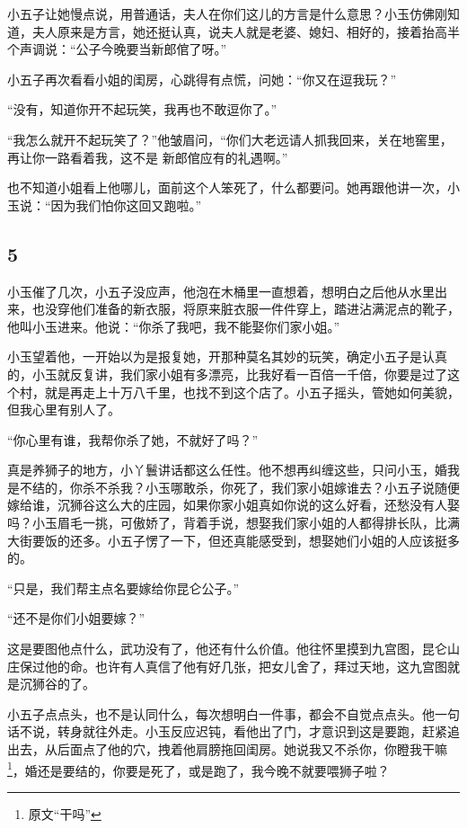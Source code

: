小五子让她慢点说，用普通话，夫人在你们这儿的方言是什么意思？小玉仿佛刚知道，夫人原来是方言，她还挺认真，说夫人就是老婆、媳妇、相好的，接着抬高半个声调说：“公子今晚要当新郎倌了呀。”

小五子再次看看小姐的闺房，心跳得有点慌，问她：“你又在逗我玩？”

“没有，知道你开不起玩笑，我再也不敢逗你了。”

“我怎么就开不起玩笑了？”他皱眉问，“你们大老远请人抓我回来，关在地窖里，再让你一路看着我，这不是
新郎倌应有的礼遇啊。”

也不知道小姐看上他哪儿，面前这个人笨死了，什么都要问。她再跟他讲一次，小玉说：“因为我们怕你这回又跑啦。”
\newline

{\centering\subsection{5}}

小玉催了几次，小五子没应声，他泡在木桶里一直想着，想明白之后他从水里出来，也没穿他们准备的新衣服，将原来脏衣服一件件穿上，踏进沾满泥点的靴子，他叫小玉进来。他说：“你杀了我吧，我不能娶你们家小姐。”

小玉望着他，一开始以为是报复她，开那种莫名其妙的玩笑，确定小五子是认真的，小玉就反复讲，我们家小姐有多漂亮，比我好看一百倍一千倍，你要是过了这个村，就是再走上十万八千里，也找不到这个店了。小五子摇头，管她如何美貌，但我心里有别人了。

“你心里有谁，我帮你杀了她，不就好了吗？”

真是养狮子的地方，小丫鬟讲话都这么任性。他不想再纠缠这些，只问小玉，婚我是不结的，你杀不杀我？小玉哪敢杀，你死了，我们家小姐嫁谁去？小五子说随便嫁给谁，沉狮谷这么大的庄园，如果你家小姐真如你说的这么好看，还愁没有人娶吗？小玉眉毛一挑，可傲娇了，背着手说，想娶我们家小姐的人都得排长队，比满大街要饭的还多。小五子愣了一下，但还真能感受到，想娶她们小姐的人应该挺多的。

“只是，我们帮主点名要嫁给你昆仑公子。”

“还不是你们小姐要嫁？”

这是要图他点什么，武功没有了，他还有什么价值。他往怀里摸到九宫图，昆仑山庄保过他的命。也许有人真信了他有好几张，把女儿舍了，拜过天地，这九宫图就是沉狮谷的了。

小五子点点头，也不是认同什么，每次想明白一件事，都会不自觉点点头。他一句话不说，转身就往外走。小玉反应迟钝，看他出了门，才意识到这是要跑，赶紧追出去，从后面点了他的穴，拽着他肩膀拖回闺房。她说我又不杀你，你瞪我干嘛\footnote{原文“干吗”}，婚还是要结的，你要是死了，或是跑了，我今晚不就要喂狮子啦？

